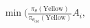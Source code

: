\documentclass[preview]{standalone}
\begin{document}
\begin{align*}
\min \big(\frac{\pi_\theta(\text{Yellow})}{\pi_{\theta_{\text{old}}}(\text{Yellow})} A_i,
\end{align*}
\end{document}
